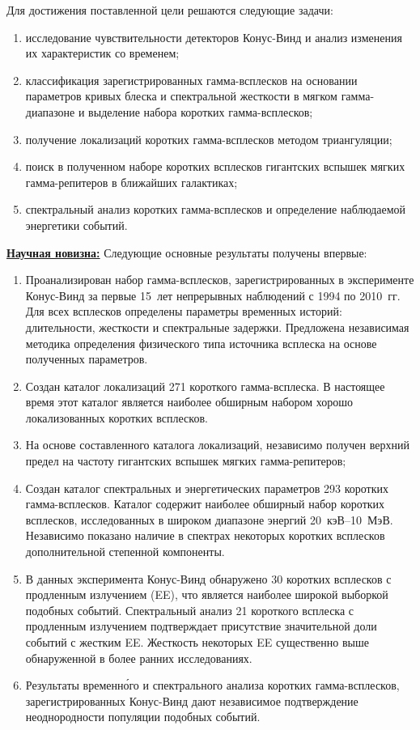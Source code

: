 Для достижения поставленной цели решаются следующие задачи:
\begin{enumerate}
\item исследование чувствительности детекторов Конус-Винд и анализ изменения 
их характеристик со временем;
\item классификация зарегистрированных гамма-всплесков на основании параметров 
кривых блеска и спектральной жесткости в мягком гамма-диапазоне и выделение набора коротких гамма-всплесков; 
\item получение локализаций коротких гамма-всплесков методом триангуляции; 
\item поиск в полученном наборе коротких всплесков гигантских 
вспышек мягких гамма-репитеров в ближайших галактиках;
\item спектральный анализ коротких гамма-всплесков и определение наблюдаемой энергетики событий.
\end{enumerate}

\underline{\textbf{Научная новизна:}}
Следующие основные результаты получены впервые:
\begin{enumerate}
\item Проанализирован набор гамма-всплесков, зарегистрированных в эксперименте 
 Конус-Винд за первые 15~лет непрерывных наблюдений с 1994 по 2010~гг. Для всех 
 всплесков определены параметры временных историй: длительности, жесткости и спектральные задержки.
 Предложена независимая методика определения физического типа источника всплеска на основе 
 полученных параметров.
\item Создан каталог локализаций 271 короткого гамма-всплеска. В настоящее время 
 этот каталог является наиболее обширным набором хорошо локализованных коротких всплесков. 
\item На основе составленного каталога локализаций, независимо
 получен верхний предел на частоту гигантских вспышек мягких гамма-репитеров;
\item Создан каталог спектральных и энергетических параметров 293 коротких гамма-всплесков. 
 Каталог содержит наиболее обширный набор коротких всплесков, исследованных 
 в широком диапазоне энергий 20~кэВ--10~МэВ. 
 Независимо показано наличие в спектрах некоторых коротких всплесков дополнительной 
 степенной компоненты.
\item В данных эксперимента Конус-Винд обнаружено 30 коротких всплесков 
 с продленным излучением (EE), что является наиболее широкой выборкой подобных событий.
 Спектральный анализ 21 короткого всплеска с продленным излучением подтверждает 
 присутствие значительной доли событий с жестким EE. 
 Жесткость некоторых EE существенно выше обнаруженной в более ранних исследованиях.  
\item Результаты временн\'{о}го и спектрального анализа коротких гамма-всплесков, 
 зарегистрированных Конус-Винд дают независимое подтверждение неоднородности 
 популяции подобных событий.
\end{enumerate}

